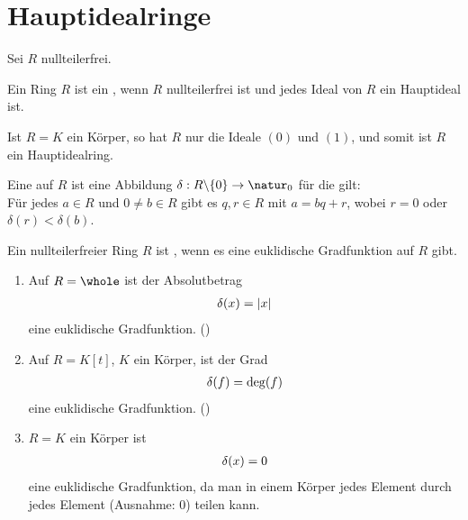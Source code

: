 \section{Hauptidealringe}

Sei $R$ nullteilerfrei.

\begin{definition}[Hauptidealring]
	Ein Ring $R$ ist ein , wenn $R$ nullteilerfrei ist und jedes Ideal von $R$ ein Hauptideal ist.
\end{definition}

\begin{example}
	Ist $R=K$ ein Körper, so hat $R$ nur die Ideale $(0)$ und $(1)$, und somit ist $R$ ein Hauptidealring.
\end{example}

\begin{definition}
	Eine  auf $R$ ist eine Abbildung $\delta:R\backslash \{0\}\to \natur_0$ für die gilt: \\
	Für jedes $a\in R$ und $0\neq b\in R$ gibt es $q,r\in R$ mit $a=bq+r$, wobei $r=0$ oder $\delta(r)<\delta(b)$.
	
	Ein nullteilerfreier Ring $R$ ist , wenn es eine euklidische Gradfunktion auf $R$ gibt.
\end{definition}

\begin{example}
	\begin{enumerate}
		\item Auf $R=\whole$ ist der Absolutbetrag 
		\begin{align}
			\delta(x)=\vert x\vert\notag
		\end{align}
		eine euklidische Gradfunktion. ()
		\item Auf $R=K[t]$, $K$ ein Körper, ist der Grad
		\begin{align}
			\delta(f) =\deg(f)\notag
		\end{align}
		eine euklidische Gradfunktion. ()
		\item $R=K$ ein Körper ist 
		\begin{align}
			\delta(x)=0\notag
		\end{align}
		eine euklidische Gradfunktion, da man in einem Körper jedes Element durch jedes Element (Ausnahme: 0) teilen kann.
	\end{enumerate}
\end{example}

